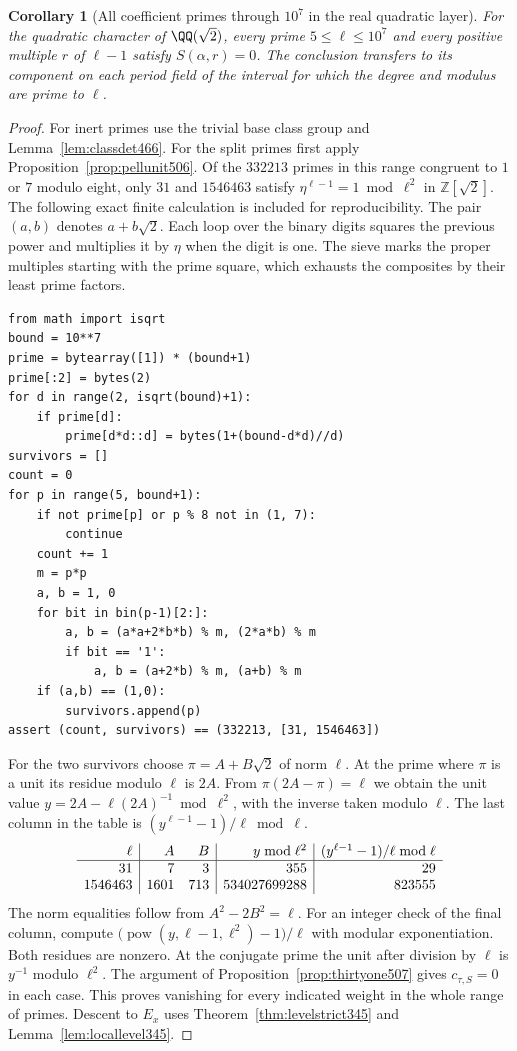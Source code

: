 \documentclass[a4paper,11pt]{article}
\newtheorem{corollary}[proposition]{Corollary}
\theoremstyle{definition}
\theoremstyle{remark}
\newcommand{\ZZ}{\mathbb Z}\newcommand{\ord}{\operatorname{ord}}
\numberwithin{equation}{section}
\begin{document}
\begin{corollary}[All coefficient primes through \(10^7\) in the real quadratic layer]\leavevmode
\label{cor:quadraticrange507}
For the quadratic character of \(\QQ(\sqrt2)\), every prime
\(5\le\ell\le10^7\) and every positive multiple \(r\) of
\(\ell-1\) satisfy \(S(\alpha,r)=0\). The conclusion transfers
to its component on each period field of the interval for which
the degree and modulus are prime to \(\ell\).
\end{corollary}
\begin{proof}
For inert primes use the trivial base class group and
Lemma~\ref{lem:classdet466}. For the split primes first apply
Proposition~\ref{prop:pellunit506}. Of the \(332213\) primes
in this range congruent to \(1\) or \(7\) modulo eight, only
\(31\) and \(1546463\) satisfy \(\eta^{\ell-1}=1\bmod\ell^2\)
in \(\ZZ[\sqrt2]\). The following exact finite calculation is
included for reproducibility. The pair \((a,b)\) denotes
\(a+b\sqrt2\). Each loop over the binary digits squares the
previous power and multiplies it by \(\eta\) when the digit is
one. The sieve marks the proper multiples starting with the
prime square, which exhausts the composites by their least
prime factors.
\begin{verbatim}
from math import isqrt
bound = 10**7
prime = bytearray([1]) * (bound+1)
prime[:2] = bytes(2)
for d in range(2, isqrt(bound)+1):
    if prime[d]:
        prime[d*d::d] = bytes(1+(bound-d*d)//d)
survivors = []
count = 0
for p in range(5, bound+1):
    if not prime[p] or p % 8 not in (1, 7):
        continue
    count += 1
    m = p*p
    a, b = 1, 0
    for bit in bin(p-1)[2:]:
        a, b = (a*a+2*b*b) % m, (2*a*b) % m
        if bit == '1':
            a, b = (a+2*b) % m, (a+b) % m
    if (a,b) == (1,0):
        survivors.append(p)
assert (count, survivors) == (332213, [31, 1546463])
\end{verbatim}

For the two survivors choose \(\pi=A+B\sqrt2\) of norm \(\ell\).
At the prime where \(\pi\) is a unit its residue modulo \(\ell\)
is \(2A\). From \(\pi(2A-\pi)=\ell\) we obtain the unit value
\(y=2A-\ell(2A)^{-1}\bmod\ell^2\), with the inverse taken
modulo \(\ell\). The last column in the table is
\((y^{\ell-1}-1)/\ell\bmod\ell\).
\[
 \begin{array}{r|r r|r|r}
 \ell&A&B& y\bmod\ell^2& (y^{\ell-1}-1)/\ell\bmod\ell\\ \hline
 31&7&3&355&29\\
 1546463&1601&713&534027699288&823555
 \end{array}
\]
The norm equalities follow from \(A^2-2B^2=\ell\). For an
integer check of the final column, compute
\(\big(\operatorname{pow}(y,\ell-1,\ell^2)-1\big)/\ell\)
with modular exponentiation. Both residues are nonzero.
At the conjugate prime the unit after division by \(\ell\)
is \(y^{-1}\) modulo \(\ell^2\). The argument of
Proposition~\ref{prop:thirtyone507} gives \(c_{\tau,S}=0\)
in each case. This proves vanishing for every indicated weight
in the whole range of primes. Descent to \(E_x\) uses
Theorem~\ref{thm:levelstrict345} and Lemma~\ref{lem:locallevel345}.
\end{proof}
\end{document}
